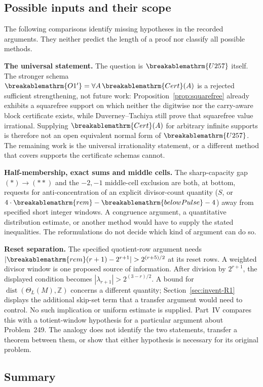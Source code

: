 \documentclass[11pt]{article}
\theoremstyle{plain}
\theoremstyle{definition}
\theoremstyle{remark}
\renewcommand{\mathrm}[1]{\ifmmode\breakablemathrm{#1}\else\textrm{#1}\fi}%
\begin{document}
\subsection{Possible inputs and their scope}

The following comparisons identify missing hypotheses in the recorded
arguments.  They neither predict the length of a proof nor classify all
possible methods.

\textbf{The universal statement.} The question is $\mathrm{U257}$ itself. The stronger schema
$\mathrm{O1'}=\forall A\,\mathrm{Cert}(A)$ is a rejected sufficient strengthening, not future work:
Proposition~\ref{prop:squarefree} already exhibits a squarefree support on which neither the
digitwise nor the carry-aware block certificate exists, while Duverney--Tachiya still
prove that squarefree value irrational. Supplying $\mathrm{Cert}(A)$ for arbitrary infinite
supports is therefore not an open equivalent normal form of $\mathrm{U257}$.  The remaining work
is the universal irrationality statement, or a different method that covers supports the
certificate schemas cannot.

\textbf{Half-membership, exact sums and middle cells.} The sharp-capacity gap $(\ast)\to(\ast\ast)$ and the
$-2,-1$ middle-cell exclusion are both, at bottom, requests for anti-concentration of an explicit
divisor-count quantity ($\ensuremath{S}$, or $4\cdot\mathrm{rem}-\mathrm{belowPulse}-4$)
away from specified short integer windows.  A congruence argument,
a quantitative distribution estimate, or another method would have to
supply the stated inequalities.  The reformulations do not decide
which kind of argument can do so.

\textbf{Reset separation.} The specified quotient-row argument
needs $|\mathrm{rem}(r+1)-2^{r+1}|>2^{(r+5)/2}$ at its reset rows.
A weighted divisor window is one proposed source of information.
After division by $2^{r+1}$, the displayed condition becomes
$|\lambda_{r+1}|>2^{(3-r)/2}$.  A bound for
$\operatorname{dist}(\Theta_L(M),\mathbb Z)$ concerns a different
quantity; Section~\ref{sec:invent-R1} displays the additional
skip-set term that a transfer argument would need to control.
No such implication or uniform estimate is supplied.
Part~IV compares this with a totient-window hypothesis for a particular
argument about Problem~249.  The analogy does not identify the two
statements, transfer a theorem between them, or show that either
hypothesis is necessary for its original problem.

\subsection{Summary}
\end{document}
